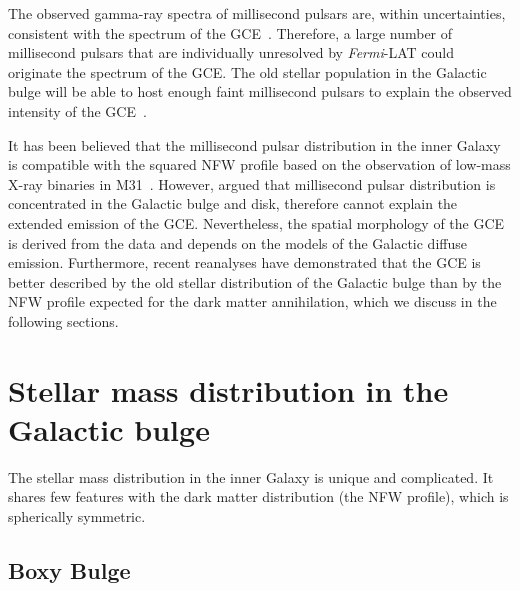 \documentclass[doublespace,nopageskip]{VTthesis} %
\begin{document}
The observed gamma-ray spectra of millisecond pulsars are, within uncertainties, consistent with the spectrum of the GCE~\cite{2011JCAP...03..010A}. Therefore, a large number of millisecond pulsars that are individually unresolved by \textit{Fermi}-LAT could originate the spectrum of the GCE. The old stellar population in the Galactic bulge will be able to host enough faint millisecond pulsars to explain the observed intensity of the GCE~\cite{2018ApJ...863..199G,2020JCAP...12..035P}.

It has been believed that the millisecond pulsar distribution in the inner Galaxy is compatible with the squared NFW profile based on the observation of low-mass X-ray binaries in M31~\cite{2012PhRvD..86h3511A}. However, \citet{2013PhRvD..88h3009H} argued that millisecond pulsar distribution is concentrated in the Galactic bulge and disk, therefore cannot explain the extended emission of the GCE. Nevertheless, the spatial morphology of the GCE is derived from the data and depends on the models of the Galactic diffuse emission. Furthermore, recent reanalyses have demonstrated that the GCE is better described by the old stellar distribution of the Galactic bulge than by the NFW profile expected for the dark matter annihilation, which we discuss in the following sections.





\section{Stellar mass distribution in the Galactic bulge}\label{se:bulge_model}

The stellar mass distribution in the inner Galaxy is unique and complicated. It shares few features with the dark matter distribution (the NFW profile), which is spherically symmetric.

\subsection{Boxy Bulge}
\end{document}
